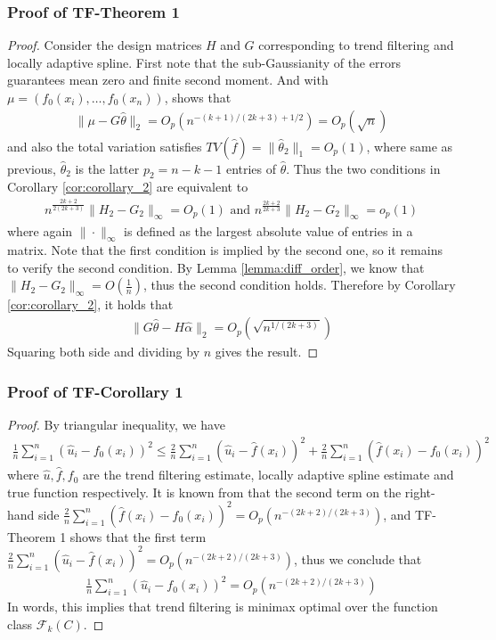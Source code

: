 \documentclass[a4paper]{article}
\renewcommand{\cal}{\mathcal}
\begin{document}
\subsubsection{Proof of TF-Theorem 1}
\begin{proof}
Consider the design matrices $H$ and $G$ corresponding to trend filtering and locally adaptive spline. First note that the sub-Gaussianity of the errors guarantees mean zero and finite second moment. And with $\mu = (f_0(x_i), \ldots, f_0(x_n))$, \cite{mammen1997locally} shows that
\begin{align*}
\|\mu - G\hat{\theta}\|_2 = O_p(n^{-(k+1)/(2k+3) + 1/2}) = O_p(\sqrt{n})
\end{align*}
and also the total variation satisfies $TV(\hat{f}) = \|\hat{\theta}_2\|_1 = O_p(1)$, where same as previous, $\hat{\theta}_2$ is the latter $p_2 = n-k-1$ entries of $\hat{\theta}$. Thus the two conditions in Corollary \ref{cor:corollary_2} are equivalent to
\begin{align*}
n^{\frac{2k+2}{2(2k+3)}}\|H_2-G_2\|_\infty = O_p(1) \text{ and }n^{\frac{2k+2}{2k+3}}\|H_2-G_2\|_\infty = o_p(1)
\end{align*}
where again $\|\cdot\|_\infty$ is defined as the largest absolute value of entries in a matrix. Note that the first condition is implied by the second one, so it remains to verify the second condition. By Lemma \ref{lemma:diff_order}, we know that $\|H_2- G_2\|_\infty = O(\frac{1}{n})$, thus the second condition holds. Therefore by Corollary \ref{cor:corollary_2}, it holds that 
\begin{align*}
\|G\hat{\theta} - H\hat{\alpha}\|_2 = O_p(\sqrt{n^{1/(2k+3)}})
\end{align*}
Squaring both side and dividing by $n$ gives the result. 
\end{proof}

\subsubsection{Proof of TF-Corollary 1}
\begin{proof}
By triangular inequality, we have 
\begin{align*}
\frac{1}{n}\sum_{i=1}^n(\hat{u}_i - f_0(x_i))^2 \leq \frac{2}{n}\sum_{i=1}^n(\hat{u}_i - \hat{f}(x_i))^2 + \frac{2}{n}\sum_{i=1}^n (\hat{f}(x_i) - f_0(x_i))^2
\end{align*}
where $\hat{u}, \hat{f}, f_0$ are the trend filtering estimate, locally adaptive spline estimate and true function respectively. It is known from \cite{mammen1997locally} that the second term on the right-hand side $\frac{2}{n}\sum_{i=1}^n (\hat{f}(x_i) - f_0(x_i))^2 = O_p(n^{-(2k+2)/(2k+3)})$, and TF-Theorem 1 shows that the first term $\frac{2}{n}\sum_{i=1}^n(\hat{u}_i - \hat{f}(x_i))^2 = O_p(n^{-(2k+2)/(2k+3)})$, thus we conclude that 
\begin{align*}
\frac{1}{n}\sum_{i=1}^n(\hat{u}_i - f_0(x_i))^2 = O_p(n^{-(2k+2)/(2k+3)})
\end{align*}
In words, this implies that trend filtering is minimax optimal over the function class $\cal{F}_k(C)$.
\end{proof}
\end{document}
